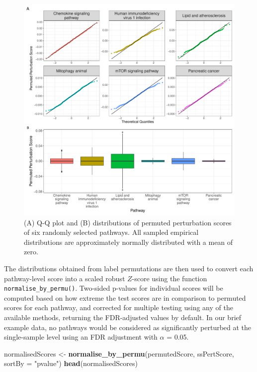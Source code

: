 \documentclass[9pt,a4paper,]{extarticle}
\newenvironment{Shaded}{\begin{snugshade}}{\end{snugshade}}
\newcommand{\AttributeTok}[1]{\textcolor[rgb]{0.13,0.29,0.53}{#1}}
\newcommand{\FunctionTok}[1]{\textcolor[rgb]{0.13,0.29,0.53}{\textbf{#1}}}
\newcommand{\NormalTok}[1]{#1}
\newcommand{\OtherTok}[1]{\textcolor[rgb]{0.56,0.35,0.01}{#1}}
\newcommand{\StringTok}[1]{\textcolor[rgb]{0.31,0.60,0.02}{#1}}
\begin{document}
\begin{figure}

{\centering \includegraphics[width=1\linewidth]{sSNAPPY_paper_files/figure-latex/Figure3-1} 

}

\caption{(A) Q-Q plot and (B) distributions of permuted perturbation scores of six randomly selected pathways. All sampled empirical distributions are approximately normally distributed with a mean of zero.}\label{fig:Figure3}
\end{figure}

The distributions obtained from label permutations are then used to convert each pathway-level score into a scaled robust \(Z\)-score using the function \texttt{normalise\_by\_permu()}.
Two-sided p-values for individual scores will be computed based on how extreme the test scores are in comparison to permuted scores for each pathway, and corrected for multiple testing using any of the available methods, returning the FDR-adjusted values by default.
In our brief example data, no pathways would be considered as significantly perturbed at the single-sample level using an FDR adjustment with \(\alpha\) = 0.05.

\begin{Shaded}
\begin{Highlighting}[]
\NormalTok{normalisedScores }\OtherTok{\textless{}{-}} \FunctionTok{normalise\_by\_permu}\NormalTok{(permutedScore, ssPertScore, }
                                       \AttributeTok{sortBy =} \StringTok{"pvalue"}\NormalTok{)}
\FunctionTok{head}\NormalTok{(normalisedScores)}
\end{Highlighting}
\end{Shaded}
\end{document}
